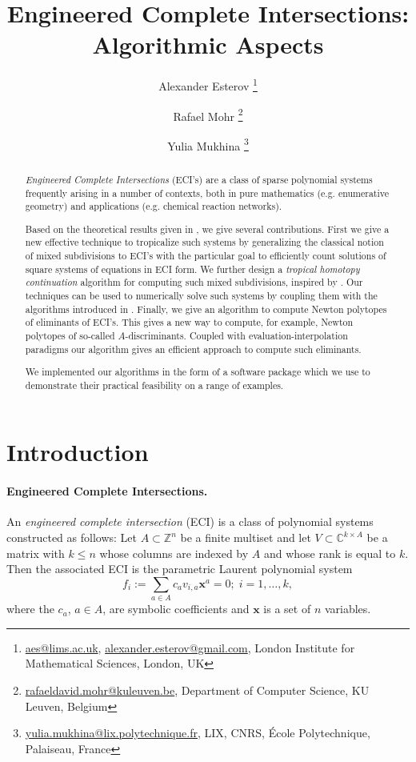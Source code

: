 \documentclass[a4paper]{article}
\title{Engineered Complete Intersections:\\ Algorithmic Aspects}
\author{Alexander Esterov \thanks{\href{aes@lims.ac.uk}{aes@lims.ac.uk}, \href{alexander.esterov@gmail.com}{alexander.esterov@gmail.com}, London Institute for Mathematical Sciences, London, UK}
  \and Rafael Mohr  \thanks{\href{mailto:rafaeldavid.mohr@kuleuven.be}{rafaeldavid.mohr@kuleuven.be}, Department of Computer Science, KU Leuven, Belgium}
  \and Yulia Mukhina \thanks{\href{mailto:yulia.mukhina@lix.polytechnique.fr}{yulia.mukhina@lix.polytechnique.fr}, LIX, CNRS, École Polytechnique, Palaiseau, France}}
\theoremstyle{remark}
\def\CC{\mathbb{C}}
\def\ZZ{\mathbb{Z}}
\def\xx{\mathbf{x}}
\begin{document}
\maketitle

\begin{abstract}
  \textit{Engineered Complete Intersections} (ECI's) are a class of
  sparse polynomial systems frequently arising in a number of
  contexts, both in pure mathematics (e.g. enumerative geometry) and
  applications (e.g. chemical reaction networks).

  Based on the theoretical results given in
  \cite{esterovEngineeredCompleteIntersections2024,
    esterovEngineeredCompleteIntersections2025}, we give several
  contributions. First we give a new effective technique to
  tropicalize such systems by generalizing the classical notion of
  mixed subdivisions \cite{huber1995} to ECI's with the particular
  goal to efficiently count solutions of square systems of equations
  in ECI form. We further design a \textit{tropical homotopy
    continuation} algorithm for computing such mixed subdivisions,
  inspired by \cite{jensenTropicalHomotopyContinuation2016,
    malajovichComputingMixedVolume2017a,
    daiseyFrameworkGeneralizedTropical2024}. Our techniques can be
  used to numerically solve such systems by coupling them with the
  algorithms introduced in
  \cite{helminckTropicalMethodSolving2024}. Finally, we give an
  algorithm to compute Newton polytopes of eliminants of ECI's. This
  gives a new way to compute, for example, Newton polytopes of
  so-called $A$-discriminants. Coupled with evaluation-interpolation
  paradigms our algorithm gives an efficient approach to compute such
  eliminants.

  We implemented our algorithms in the form of a software package
  which we use to demonstrate their practical feasibility on a range of
  examples.
\end{abstract}

\section{Introduction}
\label{sec:intro}

\paragraph*{Engineered Complete Intersections.}

An \textit{engineered complete intersection} (ECI) is a class of
polynomial systems constructed as follows: Let $A \subset \ZZ^n$ be a finite
multiset and let $V \subset \CC^{k\times A}$ be a matrix with
$k \leq n$ whose columns are indexed by $A$ and whose rank is equal to
$k$. Then the associated ECI is the parametric Laurent
polynomial system
\[f_i:=\sum_{a\in A}c_av_{i,a}\xx^a = 0;\;i=1,\hdots,k,\] where the
$c_a$, $a\in A$, are symbolic coefficients and $\xx$ is a set of $n$ variables.
\end{document}
